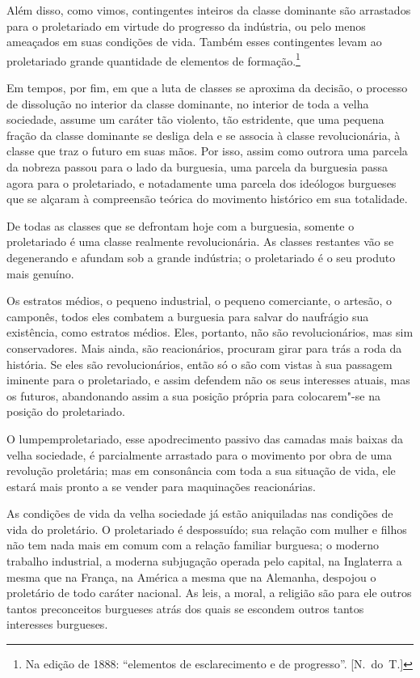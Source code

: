 Além disso, como vimos, contingentes inteiros da classe
dominante são arrastados para o proletariado em virtude do progresso da
indústria, ou pelo menos ameaçados em suas condições de vida.
Também esses contingentes levam ao proletariado grande quantidade de
elementos de
formação.\footnote{ Na edição de 1888: ``elementos de esclarecimento e de 
progresso''. [N.~do~T.]}

Em tempos, por fim, em que a luta de classes se aproxima da decisão, o
processo de dissolução no interior da classe dominante, no interior de
toda a velha sociedade, assume um caráter tão violento, tão estridente,
que uma pequena fração da classe dominante se desliga dela e se associa
à classe revolucionária, à classe que traz o futuro em suas mãos. Por
isso, assim como outrora uma parcela da nobreza passou para o lado da
burguesia, uma parcela da burguesia passa agora para o proletariado, e
notadamente uma parcela dos ideólogos burgueses que se alçaram à
compreensão teórica do movimento histórico em sua totalidade.

De todas as classes que se defrontam hoje com a burguesia, somente o
proletariado é uma classe realmente revolucionária. As classes
restantes vão se degenerando e afundam sob a grande indústria; o
proletariado é o seu produto mais genuíno.

Os estratos médios, o pequeno industrial, o pequeno comerciante, o
artesão, o camponês, todos eles combatem a burguesia para salvar do naufrágio sua
existência, como estratos médios. Eles, portanto, não
são revolucionários, mas sim conservadores. Mais ainda, são
reacionários, procuram girar para trás a roda da história. Se eles são
revolucionários, então só o são com vistas à sua passagem iminente para
o proletariado, e assim defendem não os seus interesses atuais, mas os
futuros, abandonando assim a sua posição própria para colocarem"-se na
posição do proletariado.

O lumpemproletariado, esse apodrecimento passivo das camadas mais baixas
da velha sociedade, é parcialmente arrastado para o movimento por obra
de uma revolução proletária; mas em consonância com toda a sua situação
de vida, ele estará mais pronto a se vender para maquinações
reacionárias.

As condições de vida da velha sociedade já estão aniquiladas nas
condições de vida do proletário. O proletariado é despossuído; sua
relação com mulher e filhos não tem nada mais em comum com a relação
familiar burguesa; o moderno trabalho industrial, a moderna subjugação
operada pelo capital, na Inglaterra a mesma que na França, na América a
mesma que na Alemanha, despojou o proletário de todo caráter nacional.
As leis, a moral, a religião são para ele outros tantos preconceitos
burgueses atrás dos quais se escondem outros tantos interesses
burgueses.

